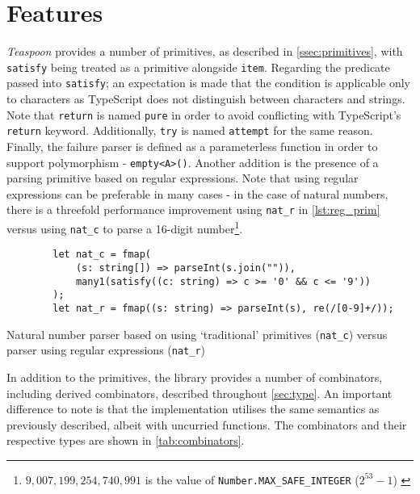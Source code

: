 \section{Features}
\label{sec:features}

\textit{Teaspoon} provides a number of primitives, as described in \autoref{ssec:primitives}, with \texttt{satisfy} being treated as a primitive alongside \texttt{item}.
Regarding the predicate passed into \texttt{satisfy}; an expectation is made that the condition is applicable only to characters as TypeScript does not distinguish between characters and strings.
Note that \texttt{return} is named \texttt{pure} in order to avoid conflicting with TypeScript's \texttt{return} keyword.
Additionally, \texttt{try} is named \texttt{attempt} for the same reason.
Finally, the failure parser is defined as a parameterless function in order to support polymorphism - \texttt{empty<A>()}.
Another addition is the presence of a parsing primitive based on regular expressions.
Note that using regular expressions can be preferable in many cases - in the case of natural numbers, there is a threefold performance improvement using \texttt{nat\_r} in \autoref{lst:reg_prim} versus using \texttt{nat\_c} to parse a 16-digit number\footnote{$9,007,199,254,740,991$ is the value of \texttt{Number.MAX\_SAFE\_INTEGER} ($2^{53}-1$) \cite{es2015spec}}.

\begin{capminted}
    \begin{verbatim}
        let nat_c = fmap(
            (s: string[]) => parseInt(s.join("")),
            many1(satisfy((c: string) => c >= '0' && c <= '9'))
        );
        let nat_r = fmap((s: string) => parseInt(s), re(/[0-9]+/));
    \end{verbatim}
    \vspace{-0.5\baselineskip}
    \caption{Natural number parser based on using `traditional' primitives (\texttt{nat\_c}) versus parser using regular expressions (\texttt{nat\_r})}
    \label{lst:reg_prim}
\end{capminted}

In addition to the primitives, the library provides a number of combinators, including derived combinators, described throughout \autoref{sec:type}.
An important difference to note is that the implementation utilises the same semantics as previously described, albeit with uncurried functions.
The combinators and their respective types are shown in \autoref{tab:combinators}.


